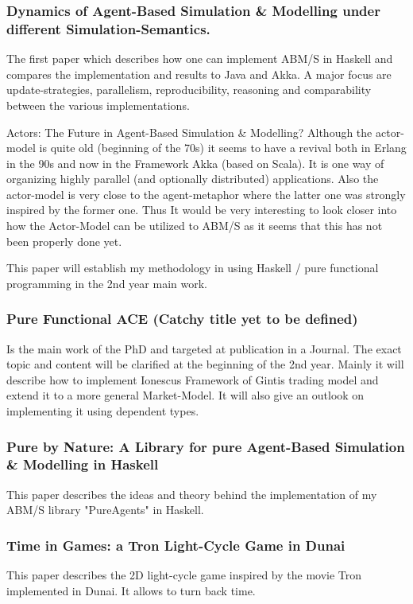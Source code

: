\subsubsection{Dynamics of Agent-Based Simulation \& Modelling under different Simulation-Semantics.}
The first paper which describes how one can implement ABM/S in Haskell and compares the implementation and results to Java and Akka. A major focus are update-strategies, parallelism, reproducibility, reasoning and comparability between the various implementations. 

Actors: The Future in Agent-Based Simulation \& Modelling?
Although the actor-model is quite old (beginning of the 70s) it seems to have a revival both in Erlang in the 90s and now in the Framework Akka (based on Scala). It is one way of organizing highly parallel (and optionally distributed) applications. Also the actor-model is very close to the agent-metaphor where the latter one was strongly inspired by the former one. Thus It would be very interesting to look closer into how the Actor-Model can be utilized to ABM/S as it seems that this has not been properly done yet.

This paper will establish my methodology in using Haskell / pure functional programming in the 2nd year main work.

\subsubsection{Pure Functional ACE (Catchy title yet to be defined)}
Is the main work of the PhD and targeted at publication in a Journal. The exact topic and content will be clarified at the beginning of the 2nd year. Mainly it will describe how to implement Ionescus Framework of Gintis trading model and extend it to a more general Market-Model. It will also give an outlook on implementing it using dependent types.

\subsubsection{Pure by Nature: A Library for pure Agent-Based Simulation \& Modelling in Haskell}
This paper describes the ideas and theory behind the implementation of my ABM/S library "PureAgents" in Haskell.

\subsubsection{Time in Games: a Tron Light-Cycle Game in Dunai}
This paper describes the 2D light-cycle game inspired by the movie Tron implemented in Dunai. It allows to turn back time.

